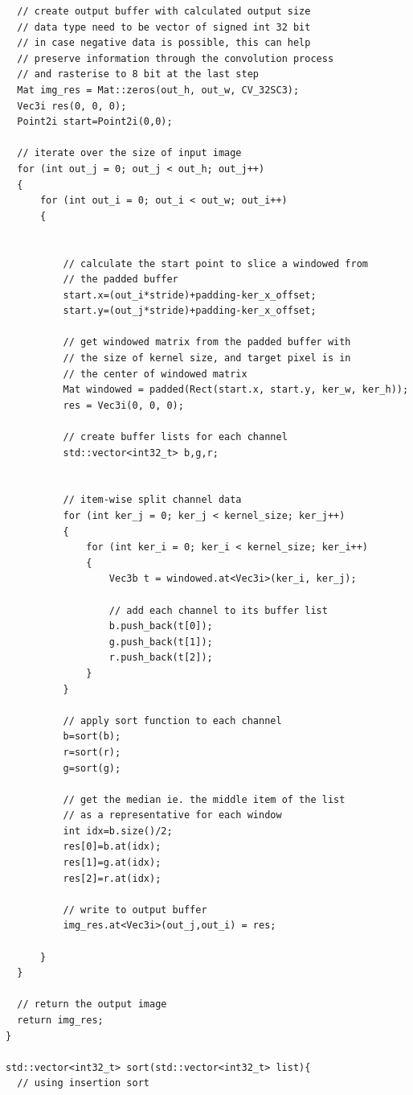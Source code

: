 \documentclass[12pt,a4paper]{report}
\begin{document}
\begin{lstlisting}
  // create output buffer with calculated output size
  // data type need to be vector of signed int 32 bit
  // in case negative data is possible, this can help
  // preserve information through the convolution process
  // and rasterise to 8 bit at the last step
  Mat img_res = Mat::zeros(out_h, out_w, CV_32SC3);
  Vec3i res(0, 0, 0);
  Point2i start=Point2i(0,0);

  // iterate over the size of input image
  for (int out_j = 0; out_j < out_h; out_j++)
  {
      for (int out_i = 0; out_i < out_w; out_i++)
      {

          
          // calculate the start point to slice a windowed from 
          // the padded buffer
          start.x=(out_i*stride)+padding-ker_x_offset;
          start.y=(out_j*stride)+padding-ker_x_offset;

          // get windowed matrix from the padded buffer with 
          // the size of kernel size, and target pixel is in
          // the center of windowed matrix
          Mat windowed = padded(Rect(start.x, start.y, ker_w, ker_h));
          res = Vec3i(0, 0, 0);

          // create buffer lists for each channel
          std::vector<int32_t> b,g,r;


          // item-wise split channel data             
          for (int ker_j = 0; ker_j < kernel_size; ker_j++)
          {
              for (int ker_i = 0; ker_i < kernel_size; ker_i++)
              {
                  Vec3b t = windowed.at<Vec3i>(ker_i, ker_j);
              
                  // add each channel to its buffer list
                  b.push_back(t[0]);
                  g.push_back(t[1]);
                  r.push_back(t[2]);
              }
          }
          
          // apply sort function to each channel
          b=sort(b);
          r=sort(r);
          g=sort(g);

          // get the median ie. the middle item of the list
          // as a representative for each window
          int idx=b.size()/2;
          res[0]=b.at(idx);
          res[1]=g.at(idx);
          res[2]=r.at(idx);

          // write to output buffer
          img_res.at<Vec3i>(out_j,out_i) = res;
          
      }
  }

  // return the output image
  return img_res;
}

std::vector<int32_t> sort(std::vector<int32_t> list){
  // using insertion sort


\end{lstlisting}
\end{document}
